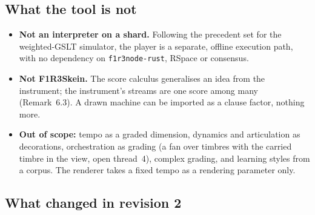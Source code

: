 \documentclass[11pt,a4paper]{article}
\theoremstyle{definition}
\theoremstyle{remark}
\begin{document}
\subsection{What the tool is not}

\begin{itemize}[leftmargin=*,itemsep=2pt]
\item \textbf{Not an interpreter on a shard.} Following the precedent set for
  the weighted-GSLT simulator, the player is a separate, offline execution path,
  with no dependency on \texttt{f1r3node-rust}, RSpace or consensus.
\item \textbf{Not F1R3Skein.} The score calculus generalises an idea from the
  instrument; the instrument's streams are one score among many (Remark~6.3).
  A drawn machine can be imported as a clause factor, nothing more.
\item \textbf{Out of scope:} tempo as a graded dimension, dynamics and
  articulation as decorations, orchestration as grading (a fan over timbres with
  the carried timbre in the view, open thread~4), complex grading, and learning
  styles from a corpus. The renderer takes a fixed tempo as a rendering
  parameter only.
\end{itemize}

\subsection{What changed in revision 2}\label{ssec:changes}
\end{document}
